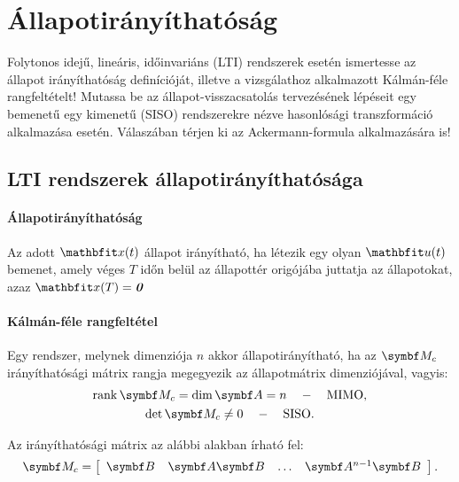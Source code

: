 \section{Állapotirányíthatóság}

\begin{about}
  Folytonos idejű, lineáris, időinvariáns (LTI) rendszerek esetén ismertesse
  az állapot irányíthatóság definícióját, illetve a vizsgálathoz alkalmazott
  Kálmán-féle rangfeltételt! Mutassa be az állapot-visszacsatolás tervezésének
  lépéseit egy bemenetű egy kimenetű (SISO) rendszerekre nézve hasonlósági
  transzformáció alkalmazása esetén. Válaszában térjen ki az Ackermann-formula
  alkalmazására is!
\end{about}

\subsection{LTI rendszerek állapotirányíthatósága}

\paragraph{Állapotirányíthatóság}

Az adott $\rvec x(t)$ állapot irányítható, ha létezik egy olyan $\rvec u(t)$
bemenet, amely véges $T$ időn belül az állapottér origójába juttatja az
állapotokat, azaz $\rvec x(T) = \nvec$

\paragraph{Kálmán-féle rangfeltétel}

Egy rendszer, melynek dimenziója $n$ akkor állapotirányítható, ha az $\rmat M_c$
irányíthatósági mátrix rangja megegyezik az állapotmátrix dimenziójával, vagyis:
\begin{gather}
  \rank \rmat M_c = \dim \rmat A = n
  \quad - \quad \text{MIMO},
  \\
  \det \rmat M_c \neq 0
  \quad - \quad \text{SISO}.
\end{gather}

Az irányíthatósági mátrix az alábbi alakban írható fel:
\bgroup
{}
\def\arraystretch{1.2}
\begin{equation}
  \rmat M_c = \left[\begin{array}{ c : c : c : c }
      \rmat B         &
      \rmat A \rmat B &
      \dots           &
      \rmat A^{n-1} \rmat B
    \end{array}\right]
  .
  \label{eq:M_c}
\end{equation}
\egroup

